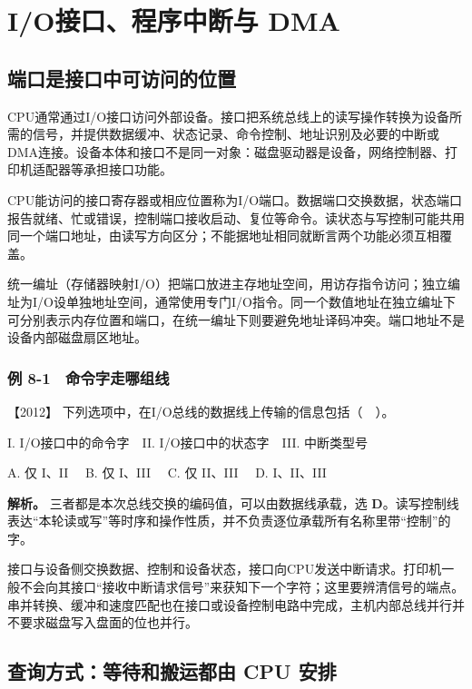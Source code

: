 \section{I/O接口、程序中断与 DMA}\label{co-ch8}

\subsection{端口是接口中可访问的位置}\label{co-08-01}

CPU通常通过I/O接口访问外部设备。接口把系统总线上的读写操作转换为设备所需的信号，并提供数据缓冲、状态记录、命令控制、地址识别及必要的中断或DMA连接。设备本体和接口不是同一对象：磁盘驱动器是设备，网络控制器、打印机适配器等承担接口功能。

CPU能访问的接口寄存器或相应位置称为I/O端口。数据端口交换数据，状态端口报告就绪、忙或错误，控制端口接收启动、复位等命令。读状态与写控制可能共用同一个端口地址，由读写方向区分；不能据地址相同就断言两个功能必须互相覆盖。

统一编址（存储器映射I/O）把端口放进主存地址空间，用访存指令访问；独立编址为I/O设单独地址空间，通常使用专门I/O指令。同一个数值地址在独立编址下可分别表示内存位置和端口，在统一编址下则要避免地址译码冲突。端口地址不是设备内部磁盘扇区地址。

\subsubsection{例 8-1　命令字走哪组线}\label{co-ex8-1}

\noindent{}【2012】 下列选项中，在I/O总线的数据线上传输的信息包括（　）。

I. I/O接口中的命令字　II. I/O接口中的状态字　III. 中断类型号

A. 仅 I、II　 B. 仅 I、III　 C. 仅 II、III　 D. I、II、III


\textbf{解析。} 三者都是本次总线交换的编码值，可以由数据线承载，选 \textbf{D}。读写控制线表达``本轮读或写''等时序和操作性质，并不负责逐位承载所有名称里带``控制''的字。

接口与设备侧交换数据、控制和设备状态，接口向CPU发送中断请求。打印机一般不会向其接口``接收中断请求信号''来获知下一个字符；这里要辨清信号的端点。串并转换、缓冲和速度匹配也在接口或设备控制电路中完成，主机内部总线并行并不要求磁盘写入盘面的位也并行。

\subsection{查询方式：等待和搬运都由 CPU 安排}\label{co-08-02}

